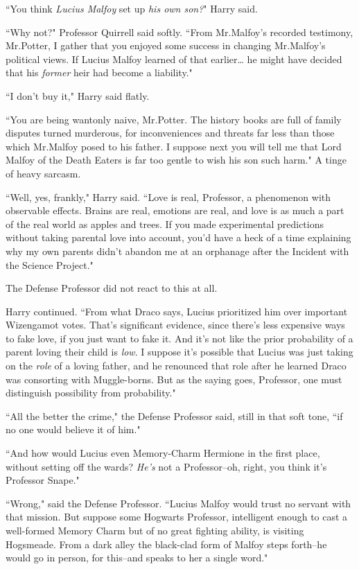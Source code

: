 ``You think \emph{Lucius Malfoy} set up \emph{his own son?}" Harry said.

``Why not?" Professor Quirrell said softly. ``From Mr.\?Malfoy's recorded testimony, Mr.\?Potter, I gather that you enjoyed some success in changing Mr.\?Malfoy's political views. If Lucius Malfoy learned of that earlier{\ldots} he might have decided that his \emph{former} heir had become a liability."

``I don't buy it," Harry said flatly.

``You are being wantonly naive, Mr.\?Potter. The history books are full of family disputes turned murderous, for inconveniences and threats far less than those which Mr.\?Malfoy posed to his father. I suppose next you will tell me that Lord Malfoy of the Death Eaters is far too gentle to wish his son such harm." A tinge of heavy sarcasm.

``Well, yes, frankly," Harry said. ``Love is real, Professor, a phenomenon with observable effects. Brains are real, emotions are real, and love is as much a part of the real world as apples and trees. If you made experimental predictions without taking parental love into account, you'd have a heck of a time explaining why my own parents didn't abandon me at an orphanage after the Incident with the Science Project."

The Defense Professor did not react to this at all.

Harry continued. ``From what Draco says, Lucius prioritized him over important Wizengamot votes. That's significant evidence, since there's less expensive ways to fake love, if you just want to fake it. And it's not like the prior probability of a parent loving their child is \emph{low}. I suppose it's possible that Lucius was just taking on the \emph{role} of a loving father, and he renounced that role after he learned Draco was consorting with Muggle-borns. But as the saying goes, Professor, one must distinguish possibility from probability."

``All the better the crime," the Defense Professor said, still in that soft tone, ``if no one would believe it of him."

``And how would Lucius even Memory-Charm Hermione in the first place, without setting off the wards? \emph{He's} not a Professor\---oh, right, you think it's Professor Snape."

``Wrong," said the Defense Professor. ``Lucius Malfoy would trust no servant with that mission. But suppose some Hogwarts Professor, intelligent enough to cast a well-formed Memory Charm but of no great fighting ability, is visiting Hogsmeade. From a dark alley the black-clad form of Malfoy steps forth\---he would go in person, for this\---and speaks to her a single word."

